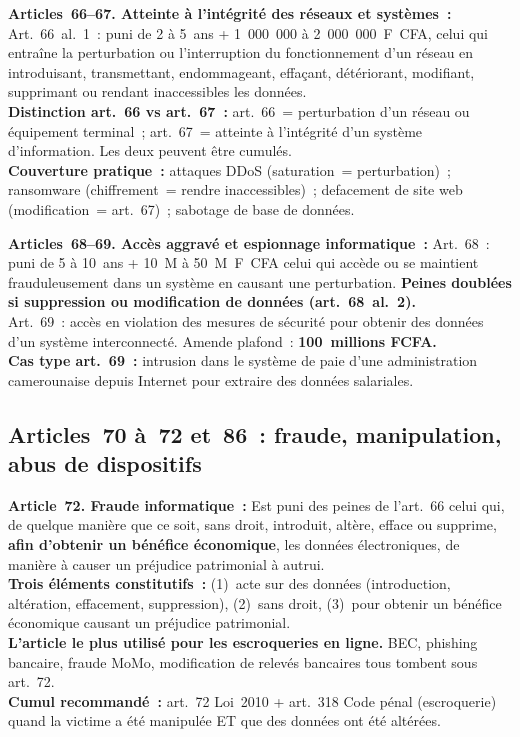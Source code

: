 \begin{boxjuris}
\textbf{Articles~66--67. Atteinte à l'intégrité des réseaux et systèmes~:}
Art.~66~al.~1~: puni de 2 à 5~ans + 1~000~000 à 2~000~000~F~CFA, celui
qui entraîne la perturbation ou l'interruption du fonctionnement d'un
réseau en introduisant, transmettant, endommageant, effaçant, détériorant,
modifiant, supprimant ou rendant inaccessibles les données.\\[0.3ex]
\textbf{Distinction art.~66 vs art.~67~:} art.~66~= perturbation d'un réseau
ou équipement terminal~; art.~67~= atteinte à l'intégrité d'un
système d'information. Les deux peuvent être cumulés.\\[0.3ex]
\textbf{Couverture pratique~:} attaques DDoS (saturation~= perturbation)~;
ransomware (chiffrement~= rendre inaccessibles)~; defacement de site web
(modification~= art.~67)~; sabotage de base de données.
\end{boxjuris}

\begin{boxjuris}
\textbf{Articles~68--69. Accès aggravé et espionnage informatique~:}
Art.~68~: puni de 5 à 10~ans + 10~M à 50~M~F~CFA celui qui accède ou
se maintient frauduleusement dans un système en causant une perturbation.
\textbf{Peines doublées si suppression ou modification de données
(art.~68~al.~2).}\\[0.3ex]
Art.~69~: accès en violation des mesures de sécurité pour obtenir des
données d'un système interconnecté. Amende plafond~: \textbf{100~millions
FCFA.}\\[0.3ex]
\textbf{Cas type art.~69~:} intrusion dans le système de paie d'une
administration camerounaise depuis Internet pour extraire des données
salariales.
\end{boxjuris}

\subsection{Articles~70 à~72 et~86~: fraude, manipulation, abus de dispositifs}

\begin{boxjuris}
\textbf{Article~72. Fraude informatique~:}
Est puni des peines de l'art.~66 celui qui, de quelque manière que ce
soit, sans droit, introduit, altère, efface ou supprime, \textbf{afin
d'obtenir un bénéfice économique}, les données électroniques, de manière
à causer un préjudice patrimonial à autrui.\\[0.3ex]
\textbf{Trois éléments constitutifs~:} (1)~acte sur des données
(introduction, altération, effacement, suppression), (2)~sans droit,
(3)~pour obtenir un bénéfice économique causant un préjudice patrimonial.\\[0.3ex]
\textbf{L'article le plus utilisé pour les escroqueries en ligne.}
BEC, phishing bancaire, fraude MoMo, modification de relevés bancaires
tous tombent sous art.~72.\\[0.3ex]
\textbf{Cumul recommandé~:} art.~72 Loi~2010 + art.~318 Code pénal
(escroquerie) quand la victime a été manipulée ET que des données
ont été altérées.
\end{boxjuris}

